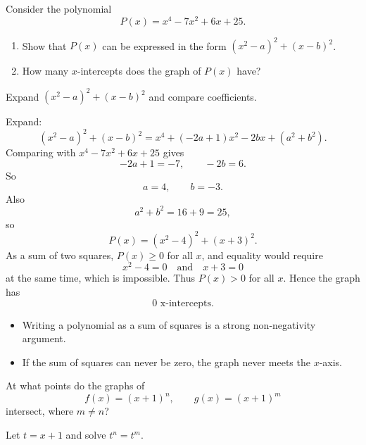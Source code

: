 
\begin{problem}
Consider the polynomial
\[
P(x)=x^4-7x^2+6x+25.
\]
\begin{enumerate}[label=(\roman*)]
\item Show that $P(x)$ can be expressed in the form $(x^2-a)^2+(x-b)^2$.
\item How many $x$-intercepts does the graph of $P(x)$ have?
\end{enumerate}
\end{problem}

\begin{hintbox}
Expand $(x^2-a)^2+(x-b)^2$ and compare coefficients.
\end{hintbox}

\begin{solution}
Expand:
\[
(x^2-a)^2+(x-b)^2=x^4+(-2a+1)x^2-2bx+(a^2+b^2).
\]
Comparing with $x^4-7x^2+6x+25$ gives
\[
-2a+1=-7,\qquad -2b=6.
\]
So
\[
a=4,\qquad b=-3.
\]
Also
\[
a^2+b^2=16+9=25,
\]
so
\[
P(x)=(x^2-4)^2+(x+3)^2.
\]
As a sum of two squares, $P(x)\ge 0$ for all $x$, and equality would require
\[
x^2-4=0\quad\text{and}\quad x+3=0
\]
at the same time, which is impossible. Thus $P(x)>0$ for all $x$.
Hence the graph has
\[
\boxed{0\text{ x-intercepts}.}
\]
\end{solution}

\begin{takeaways}
\begin{itemize}[leftmargin=*]
\item Writing a polynomial as a sum of squares is a strong non-negativity argument.
\item If the sum of squares can never be zero, the graph never meets the $x$-axis.
\end{itemize}
\end{takeaways}

\begin{problem}
At what points do the graphs of
\[
f(x)=(x+1)^n,\qquad g(x)=(x+1)^m
\]
intersect, where $m\ne n$?
\end{problem}

\begin{hintbox}
Let $t=x+1$ and solve $t^n=t^m$.
\end{hintbox}

